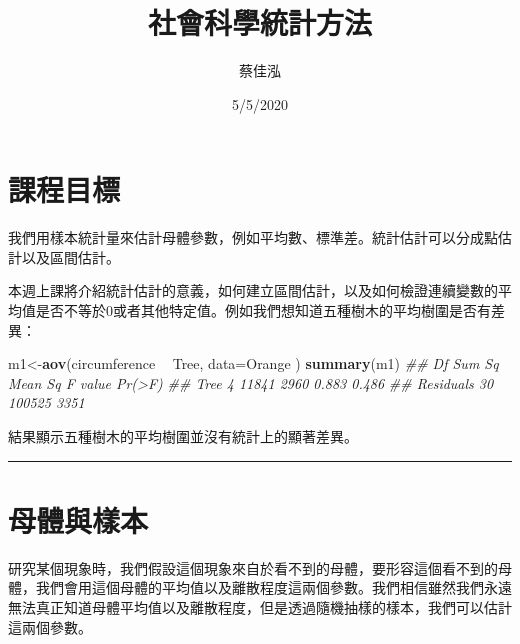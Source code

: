 \documentclass[hyperref,]{ctexart}
\title{社會科學統計方法\\\vspace{0.5em}{\large 統計估計、假設檢定、變異數分析}}
\author{蔡佳泓}
\date{5/5/2020}
\newenvironment{Shaded}{\begin{snugshade}}{\end{snugshade}}
\newcommand{\CommentTok}[1]{\textcolor[rgb]{0.56,0.35,0.01}{\textit{#1}}}
\newcommand{\DataTypeTok}[1]{\textcolor[rgb]{0.13,0.29,0.53}{#1}}
\newcommand{\KeywordTok}[1]{\textcolor[rgb]{0.13,0.29,0.53}{\textbf{#1}}}
\newcommand{\NormalTok}[1]{#1}
\newcommand{\OperatorTok}[1]{\textcolor[rgb]{0.81,0.36,0.00}{\textbf{#1}}}
\newcommand{\StringTok}[1]{\textcolor[rgb]{0.31,0.60,0.02}{#1}}
\begin{document}
\maketitle


\renewcommand{\contentsname}{目次}
\renewcommand{\listtablename}{表次}
\renewcommand{\listfigurename}{圖次}
\renewcommand{\figurename}{圖}
\begin{center}
\tableofcontents
\listoftables
\listoffigures
\end{center}

\vspace{2cm}

\hypertarget{ux8ab2ux7a0bux76eeux6a19}{%
\section{課程目標}\label{ux8ab2ux7a0bux76eeux6a19}}

我們用樣本統計量來估計母體參數，例如平均數、標準差。統計估計可以分成點估計以及區間估計。

本週上課將介紹統計估計的意義，如何建立區間估計，以及如何檢證連續變數的平均值是否不等於0或者其他特定值。例如我們想知道五種樹木的平均樹圍是否有差異：

\begin{Shaded}
\begin{Highlighting}[]
\NormalTok{m1<-}\KeywordTok{aov}\NormalTok{(circumference }\OperatorTok{~}\StringTok{ }\NormalTok{Tree, }\DataTypeTok{data=}\NormalTok{Orange )}
\KeywordTok{summary}\NormalTok{(m1)}
\CommentTok{##             Df Sum Sq Mean Sq F value Pr(>F)}
\CommentTok{## Tree         4  11841    2960   0.883  0.486}
\CommentTok{## Residuals   30 100525    3351}
\end{Highlighting}
\end{Shaded}

結果顯示五種樹木的平均樹圍並沒有統計上的顯著差異。

\begin{center}\rule{0.5\linewidth}{0.5pt}\end{center}

\hypertarget{ux6bcdux9ad4ux8207ux6a23ux672c}{%
\section{母體與樣本}\label{ux6bcdux9ad4ux8207ux6a23ux672c}}

研究某個現象時，我們假設這個現象來自於看不到的母體，要形容這個看不到的母體，我們會用這個母體的平均值以及離散程度這兩個參數。我們相信雖然我們永遠無法真正知道母體平均值以及離散程度，但是透過隨機抽樣的樣本，我們可以估計這兩個參數。
\end{document}

